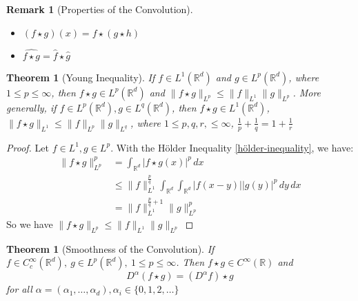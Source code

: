 \documentclass{report}
\theoremstyle{tommy}
\newtheorem{thm}[defn]{Theorem}
\newtheorem{rem}[defn]{Remark}
\begin{document}
  \begin{rem}[Properties of the Convolution]
    \begin{itemize}
      \item \((f \star g)(x) = f \star (g \star h)\)
      \item \(\hat{f \star g} = \hat f \star \hat g\)
    \end{itemize}
  \end{rem}


  \begin{thm}[Young Inequality]
    If \(f \in L^1(\mathbb{R}^d)\) and \(g \in L^p(\mathbb{R}^d)\), where \(1 \le p \le \infty\), then \(f \star g \in L^p(\mathbb{R}^d)\) and \(\|f \star g \|_{L^p} \le \|f\|_{L^1} \|g\|_{L^p}\). More generally, if \(f \in L^p(\mathbb{R}^d), g \in L^q(\mathbb{R}^d)\), then \(f \star g \in L^1(\mathbb{R}^d)\), \(\| f \star g\|_{L^1} \le \|f\|_{L^p} \|g\|_{L^q}\), where \(1 \le p, q, r, \le \infty\), \(\frac{1}{p} + \frac{1}{q} = 1 + \frac{1}{r}\)
  \end{thm}

  \begin{proof}
    Let \(f \in L^1, g \in L^p\). With the Hölder Inequality \ref{hölder-inequality}, we have:
    \begin{align*}
      \|f \star g\|_{L^p}^p
      &= \int_{\mathbb{R}^d} |f \star g(x)|^p \, dx \\
      &\le \|f\|_{L^1}^{\frac{p}{q}} \int_{\mathbb{R}^d} \int_{\mathbb{R}^d} |f(x-y)||g(y)|^p \, dy \, dx \\
      &= \| f \|_{L^1}^{\frac{p}{q} + 1} \|g\|_{L^p}^p
    \end{align*}
    So we have \(\| f \star g \|_{L^p} \le \|f\|_{L^1} \|g\|_{L^p}\)
  \end{proof}

  \begin{thm}[Smoothness of the Convolution]
    If \(f \in C_c^\infty(\mathbb{R}^d),\ g \in L^p(\mathbb{R}^d),\ 1 \le p \le \infty\). Then \(f \star g \in C^\infty(\mathbb{R})\) and 
    \[D^\alpha (f\star g) = (D^\alpha f) \star g\]
    for all \(\alpha = (\alpha_1, \dots, \alpha_d), \alpha_i \in \{0, 1, 2, \dots\}\)
  \end{thm}
\end{document}
